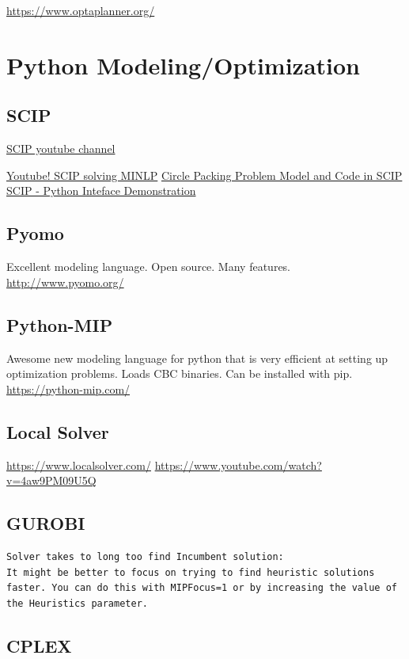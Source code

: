 \documentclass[letter,12pt]{book}
\renewcommand{\0}{\mathbf{0}}
\begin{document}
\url{https://www.optaplanner.org/}
\section{Python Modeling/Optimization}
\subsection{SCIP}
\href{https://www.youtube.com/channel/UCpu5Kj1Q9SQ1kZ1QlwsurAQ}{SCIP youtube channel}

\href{https://www.youtube.com/watch?v=FFqGzckSRW4}{Youtube! SCIP solving MINLP}
\href{https://youtu.be/FFqGzckSRW4?t=734}{Circle Packing Problem Model and Code in SCIP}
\href{https://www.youtube.com/watch?v=7SvapoXVYq0}{SCIP - Python Inteface Demonstration}

\subsection{Pyomo}
Excellent modeling language.  Open source.  Many features.
\url{http://www.pyomo.org/}

\subsection{Python-MIP}
Awesome new modeling language for python that is very efficient at setting up optimization problems.  Loads CBC binaries.  Can be installed with pip.
\url{https://python-mip.com/}


\subsection{Local Solver}

\url{https://www.localsolver.com/}
\url{https://www.youtube.com/watch?v=4aw9PM09U5Q}

\subsection{GUROBI}

\begin{verbatim}
Solver takes to long too find Incumbent solution:
It might be better to focus on trying to find heuristic solutions faster. You can do this with MIPFocus=1 or by increasing the value of the Heuristics parameter.
\end{verbatim}

\subsection{CPLEX}
\end{document}
